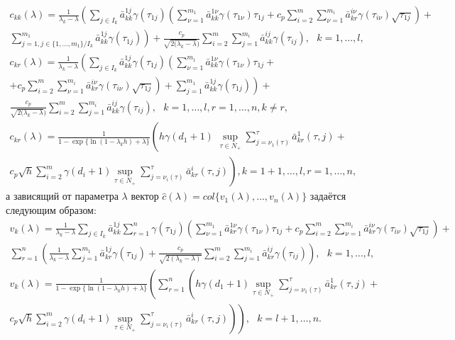 $$
\begin{array}{crl}
c_{kk} (\lambda) = \frac{1}{\lambda _k - \lambda}\left(\sum
\limits_{j \in I_k}\bar a^{1j}_{kk}\gamma (\tau _{1j})\left(\sum
\limits_{\nu=1}^{m_1}\bar a^{1\nu}_{kk} \gamma (\tau _{1\nu}) \tau _{1j}+
c_p\sum \limits_{i=2}^m \sum \limits_{\nu=1}^{m_i}\bar
a^{i\nu}_{kr}\gamma (\tau _{i\nu})\sqrt{\tau _{1j}}\right) \right.+\\
\left. \sum \limits_{j=1, j \in \{1,\dots,m_1\}/ I_k}^{m_1} \bar
a^{1j}_{kk}\gamma (\tau _{1j})\right)+ \frac{c_p}{\sqrt{2(\lambda_k
-\lambda})}\sum \limits_{i=2}^m \sum \limits_{j=1}^{m_i}\bar
a^{ij}_{kk}\gamma (\tau
_{ij}), \ \ \ k = 1,\dots,l,\\
c_{kr}(\lambda) = \frac{1}{\lambda _k - \lambda}\left(\sum
\limits_{j \in I_k}\bar a^{1j}_{kk}\gamma (\tau _{1j})\left(\sum
\limits_{\nu=1}^{m_1}\bar a^{1\nu}_{kk} \gamma (\tau _{1\nu}) \tau _{1j}+
\right. \right. \\ \left. \left. +
c_p\sum \limits_{i=2}^m \sum \limits_{\nu=1}^{m_i}\bar
a^{i\nu}_{kr}\gamma (\tau _{i\nu})\sqrt{\tau _{1j}}\right) + \sum
\limits_{j=1}^{m_1} \bar a^{1j}_{kk}\gamma (\tau _{1j})\right)+\\
\frac{c_p}{\sqrt{2(\lambda_k -\lambda})}\sum \limits_{i=2}^m \sum
\limits_{j=1}^{m_i}\bar a^{ij}_{kk}\gamma (\tau _{ij}), \ \ \ k =
1,\dots,l,r = 1, \dots, n, k \neq r,\\
 c_{kr}(\lambda) = \frac{1}{1-\exp\{\ln(1-\lambda_kh)+\lambda\}}
\left(h\gamma (d_1 +1)\,\, \mathrel {\mathop
{\sup} \limits _{\tau \in N_+}}\sum \limits _{j=\nu
_1 (\tau)}^{\tau}\bar a^{1}_{kr}(\tau,j) + \right. \\
\left. c_p\sqrt{h}\sum \limits _{i=2}^{m}\gamma (d_i +1)\mathrel
{\mathop {\sup} \limits _{\tau \in N_+}}\sum \limits _{j=\nu _i
(\tau)}^{\tau}\bar a^{i}_{kr}(\tau,j)\right), k = 1 + 1,\dots,l,r =
1, \dots, n,
\end{array}
$$
а зависящий от параметра $\lambda$ вектор $\hat c(\lambda) = col
\{v_1 (\lambda), \dots, v_n (\lambda )\}$
 задаётся следующим образом:
$$
\begin{array}{crl}
v_ k(\lambda ) = \frac{1}{\lambda _k - \lambda}\sum \limits_{j \in
I_k}\bar a^{1j}_{kk}\sum \limits_{r=1}^n\gamma (\tau
_{1j})\left(\sum \limits_{\nu=1}^{m_1}\bar a^{1\nu}_{kr} \gamma
(\tau _{1\nu})\tau _{1j} + c_p\sum \limits_{i=2}^m \sum
\limits_{\nu=1}^{m_i}\bar a^{i\nu}_{kr}\gamma (\tau
_{i\nu})\sqrt{\tau _{1j}}\right) +\\
\sum \limits_{r=1}^{n}\left(\frac{1}{\lambda _k - \lambda}\sum
\limits_{j=1}^{m_1}\bar a^{1j}_{kr}\gamma (\tau_{1j}) +
\frac{c_p}{\sqrt{2(\lambda_k -\lambda)}}\sum \limits_{i=2}^m \sum
\limits_{j=1}^{m_i}\bar a^{ij}_{kr}\gamma (\tau _{ij})\right), \ \
\ k  = 1,\dots,l,\\
v_ k(\lambda ) = \frac{1}{1-\exp\{\ln(1-\lambda_kh)+\lambda\}}
\left(\sum \limits _{r=1 }^n\left( h\gamma (d_1 +1)\mathrel {\mathop
{\sup} \limits _{\tau \in N_+}}\sum \limits _{j=\nu
_1 (\tau)}^{\tau}\bar a^{1}_{kr}(\tau,j) +\right. \right.\\
\left.\left.c_p\sqrt{h}\sum \limits _{i=2}^{m}\gamma (d_i
+1)\mathrel {\mathop {\sup} \limits _{\tau \in N_+}}\sum \limits
_{j=\nu _i (\tau)}^{\tau}\bar a^{i}_{kr}(\tau,j) \right)\right),\
\ \ k = l+1, \dots,n.
\end{array}
$$

